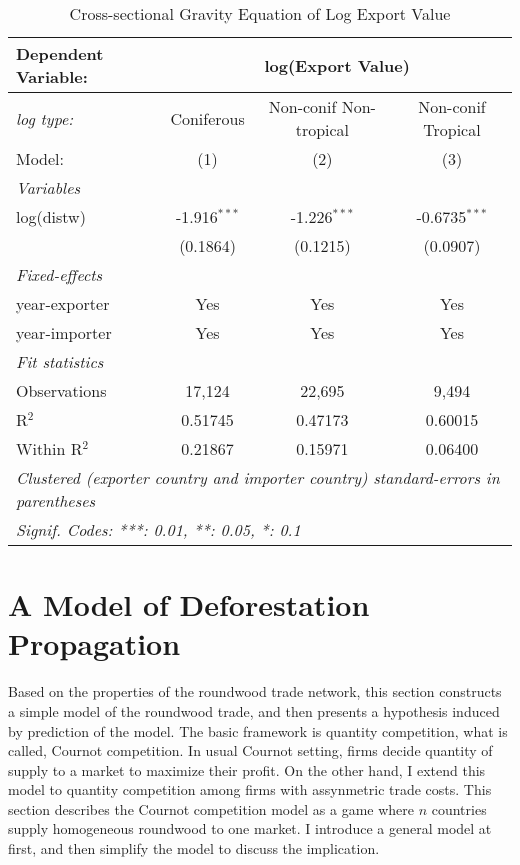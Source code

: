 \documentclass[a4paper,12pt]{article}
\begin{document}
   \begin{table}[H]
    \caption{Cross-sectional Gravity Equation of Log Export Value}
    \centering
    \begin{tabular}{lccc}
       \tabularnewline \midrule \midrule
       Dependent Variable: & \multicolumn{3}{c}{log(Export Value)}\\
       \midrule
       \textit{log type: } & Coniferous & Non-conif Non-tropical & Non-conif Tropical\\
       Model:                             & (1)            & (2)            & (3)\\  
       \midrule
       \emph{Variables}\\
       log(distw)                         & -1.916$^{***}$ & -1.226$^{***}$ & -0.6735$^{***}$\\   
       & (0.1864)       & (0.1215)       & (0.0907)\\   
        \midrule
        \emph{Fixed-effects}\\
        year-exporter  & Yes            & Yes            & Yes\\  
        year-importer   & Yes            & Yes            & Yes\\  
        \midrule
        \emph{Fit statistics}\\
        Observations                       & 17,124         & 22,695         & 9,494\\  
        R$^2$                              & 0.51745        & 0.47173        & 0.60015\\  
        Within R$^2$                       & 0.21867        & 0.15971        & 0.06400\\  
        \midrule \midrule
        \multicolumn{4}{l}{\emph{Clustered (exporter country and importer country) standard-errors in parentheses}}\\
        \multicolumn{4}{l}{\emph{Signif. Codes: ***: 0.01, **: 0.05, *: 0.1}}\\
    \end{tabular}
 \end{table}

\section{A Model of Deforestation Propagation}
Based on the properties of the roundwood trade network, this section constructs a simple model of the roundwood trade, and then presents a hypothesis induced by prediction of the model. The basic framework is quantity competition, what is called, Cournot competition. In usual Cournot setting, firms decide quantity of supply to a market to maximize their profit. On the other hand, I extend this model to quantity competition among firms with assynmetric trade costs. This section describes the Cournot competition model as a game where $n$ countries supply homogeneous roundwood to one market. I introduce a general model at first, and then simplify the model to discuss the implication. \\
\end{document}
